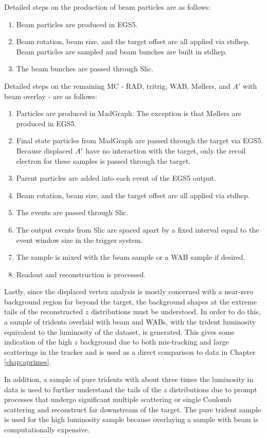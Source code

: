 Detailed steps on the production of beam particles are as follows:
\begin{enumerate}
  \item Beam particles are produced in EGS5.
  \item Beam rotation, beam size, and the target offset are all applied via stdhep. Beam particles are sampled and beam bunches are built in stdhep.
  \item The beam bunches are passed through Slic.
\end{enumerate}

Detailed steps on the remaining MC - RAD, tritrig, WAB, M\o llers, and $A'$ with beam overlay - are as follows:
\begin{enumerate}
  \item Particles are produced in MadGraph. The exception is that M\o llers are produced in EGS5.
  \item Final state particles from MadGraph are passed through the target via EGS5. Because displaced $A^\prime$ have no interaction with the target, only the recoil electron for these samples is passed through the target.
  \item Parent particles are added into each event of the EGS5 output.
  \item Beam rotation, beam size, and the target offset are all applied via stdhep. 
  \item The events are passed through Slic.
  \item The output events from Slic are spaced apart by a fixed interval equal to the event window size in the trigger system.
  \item The sample is mixed with the beam sample or a WAB sample if desired.
  \item Readout and reconstruction is processed.
\end{enumerate}

Lastly, since the displaced vertex analysis is mostly concerned with a near-zero background region far beyond the target, the background shapes at the extreme tails of the reconstructed $z$ distributions must be understood. In order to do this, a sample of tridents overlaid with beam and WABs, with the trident luminosity equivalent to the luminosity of the dataset, is generated. This gives some indication of the high $z$ background due to both mis-tracking and large scatterings in the tracker and is used as a direct comparison to data in Chapter \ref{chap:aprimes}.

In addition, a sample of pure tridents with about three times the luminosity in data is used to further understand the tails of the $z$ distributions due to prompt processes that undergo significant multiple scattering or single Coulomb scattering and reconstruct far downstream of the target. The pure trident sample is used for the high luminosity sample because overlaying a sample with beam is computationally expensive.

